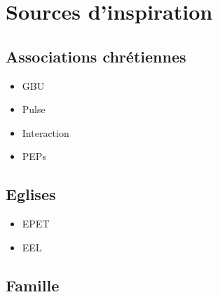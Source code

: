 \section{Sources d'inspiration}

	\subsection{Associations chrétiennes}
	
	\begin{itemize}
	\item GBU %
	\item Pulse %
	\item Interaction %
	\item PEPs %
	\end{itemize}
	
	\subsection{Eglises}
	
	\begin{itemize}
	\item EPET %
	\item EEL %
	\end{itemize}
	
	\subsection{Famille}
	
	
	
